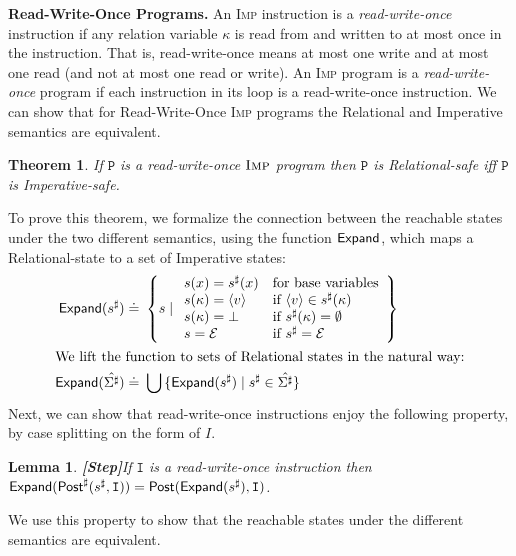 \documentclass[nocopyrightspace]{sigplanconf}
\makeatletter
\newtheorem{@protheo}{Theorem}
\newenvironment{theorem}[1]{\begin{@protheo}{\rm \bf #1}\it}{\end{@protheo}}
\newtheorem{lemma}{Lemma}{\bfseries\upshape}{\itshape}
\newcommand{\defeq}{\doteq\ }
\def\mypara#1{\smallskip\noindent\textbf{#1}}
\def\set#1{{\{ #1\}}}
\def\zug#1{{\langle #1 \rangle}}
\newcommand{\mybar}[1]{\zug{#1}}
\newcommand{\ERROR}{\mathit{Error}}
\newcommand{\kvar}{\kappa}
\newcommand{\ilang}{\textsc{Imp}\xspace}
\newcommand{\istate}{s}
\newcommand{\istates}{\Sigma}
\newcommand{\rstate}{\istate^{\sharp}}
\newcommand{\rstates}{\istates^{\sharp}}
\def\instr{\mathtt{I}}
\def\prgm{\mathtt{P}}
\def\rkvar{{\kvar}}
\def\RELSEM{{Relational}\xspace}
\def\IMPSEM{{Imperative}\xspace}
\def\REFREL{relation\xspace}
\def\ERROR{{\mathcal{E}}}
\def\EXPAND{{\sf Expand}}
\def\rpost{\mathsf{Post}^{\sharp}}
\def\ipost{\mathsf{Post}}
\makeatother
\begin{document}
\mypara{Read-Write-Once Programs.} 
An \ilang instruction is a \emph{read-write-once} instruction if
any \REFREL variable $\rkvar$ is read from and written 
to at most once in the instruction. 
That is, read-write-once means at most one write and at most one read
(and not at most one read or write).
An \ilang program is a \emph{read-write-once} program if each instruction 
in its loop is a read-write-once instruction.
We can show that for Read-Write-Once \ilang programs 
the \RELSEM and \IMPSEM semantics are equivalent.

\begin{theorem}{}\label{th:rwo-equiv}
If $\prgm$ is a \emph{read-write-once} $\ilang$ program then   
$\prgm$ is \emph{\RELSEM-safe} iff $\prgm$ is \emph{\IMPSEM-safe}.
\end{theorem}

To prove this theorem, we formalize the connection between the
reachable states under the two different semantics, using the function
$\EXPAND$, which maps a \RELSEM-state to a set of \IMPSEM states:
\begin{align*}
\EXPAND(\rstate) \defeq & 
	\left\{ \istate \mid 
		\begin{array}{ll}
                \istate(x) = \rstate(x) 	& \mbox{for base variables}\\
		\istate(\rkvar) = \mybar{v} 	& \mbox{if }\mybar{v} \in \rstate(\kvar)\\
		\istate(\rkvar) = \bot		& \mbox{if }\rstate(\rkvar) = \emptyset\\
		\istate = \ERROR		& \mbox{if }\rstate = \ERROR
                \end{array} 
        \right\} \\
\intertext{We lift the function to sets of \RELSEM states in the natural way:} 
\EXPAND(\hat{\rstates}) \defeq & \bigcup \set{\EXPAND(\rstate) \mid \rstate \in \hat{\rstates}}
\end{align*}
Next, we can show that read-write-once instructions enjoy the following
property, by case splitting on the form of $I$.

\begin{lemma}{\textbf{[Step]}}\label{lemma:step-lemma}
If $\instr$ is a read-write-once instruction then
$\EXPAND(\rpost(\rstate, \instr)) = \ipost(\EXPAND(\rstate), \instr)$.
\end{lemma}



We use this property to show that the reachable states under the different
semantics are equivalent.
\end{document}
